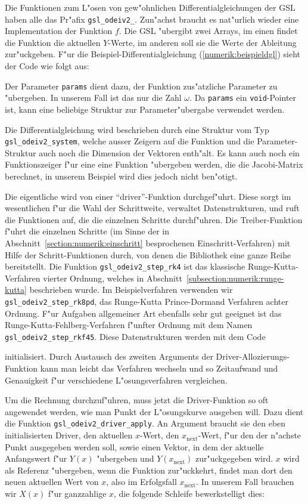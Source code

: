 Die Funktionen zum L"osen von gew"ohnlichen Differentialgleichungen
der GSL haben alle das Pr"afix \texttt{gsl\_odeiv2\_}. 
Zun"achst braucht es nat"urlich wieder eine Implementation der
Funktion $f$. 
Die GSL "ubergibt zwei Arrays, im einen findet die Funktion die aktuellen
$Y$-Werte, im anderen soll sie die Werte der Ableitung zur"uckgeben.
F"ur die Beispiel-Differentialgleichung (\ref{numerik:beispieldgl})
sieht der Code wie folgt aus:

Der Parameter \texttt{params} dient dazu, der Funktion zus"atzliche
Parameter zu "ubergeben.
In unserem Fall ist das nur die Zahl $\omega$.
Da \texttt{params} ein \texttt{void}-Pointer ist, kann eine beliebige
Struktur zur Parameter"ubergabe verwendet werden.

Die Differentialgleichung wird beschrieben durch eine Struktur vom Typ
\texttt{gsl\_odeiv2\_system}, welche ausser Zeigern auf die Funktion
und die Parameter-Struktur auch noch die Dimension der Vektoren enth"alt.
Es kann auch noch ein Funktionszeiger f"ur eine eine Funktion "ubergeben
werden, die die Jacobi-Matrix berechnet, in unserem Beispiel wird dies
jedoch nicht ben"otigt.

Die eigentliche wird von einer ``driver''-Funktion durchgef"uhrt.
Diese sorgt im wesentlichen f"ur die Wahl der Schrittweite, verwaltet
Datenstrukturen, und ruft die Funktionen auf, die die einzelnen Schritte
durchf"uhren.
Die Treiber-Funktion f"uhrt die einzelnen Schritte (im Sinne der
in Abschnitt~\ref{section:numerik:einschritt} besprochenen
Einschritt-Verfahren) mit
Hilfe der Schritt-Funktionen durch, von denen die Bibliothek eine
ganze Reihe bereitstellt.
Die Funktion \texttt{gsl\_odeiv2\_step\_rk4} ist das klassische
Runge-Kutta-Verfahren vierter Ordnung, welches in
Abschnitt~\ref{subsection:numerik:runge-kutta}
beschrieben wurde.
Im Beispielverfahren verwenden wir \texttt{gsl\_odeiv2\_step\_rk8pd},
das Runge-Kutta Prince-Dormand Verfahren achter Ordnung.
F"ur Aufgaben allgemeiner Art ebenfalls sehr gut geeignet ist das
Runge-Kutta-Fehlberg-Verfahren f"unfter Ordnung mit dem Namen
\texttt{gsl\_odeiv2\_step\_rkf45}.
Diese Datenstrukturen werden mit dem Code

initialisiert.
Durch Austausch des zweiten Arguments der Driver-Allozierungs-Funktion
kann man leicht das Verfahren wechseln und so Zeitaufwand und Genauigkeit
f"ur verschiedene L"osungsverfahren vergleichen.

Um die Rechnung durchzuf"uhren, muss jetzt die Driver-Funktion so oft
angewendet werden, wie man Punkt der L"osungskurve ausgeben will.
Dazu dient die Funktion \texttt{gsl\_odeiv2\_driver\_apply}. 
An Argument braucht sie den eben initialisierten Driver, den aktuellen
$x$-Wert, den $x_{\text{next}}$-Wert, f"ur den der n"achste Punkt
ausgegeben werden soll, sowie einen Vektor, in dem der aktuelle Anfangswert
f"ur $Y(x)$ "ubergeben und $Y(x_{\text{next}})$ zur"uckgegeben wird.
$x$ wird als Referenz "ubergeben, wenn die Funktion zur"uckkehrt,
findet man dort den neuen aktuellen Wert von $x$, also im Erfolgsfall
$x_{\text{next}}$.
In unserem Fall brauchen wir $X(x)$ f"ur ganzzahlige $x$, die folgende
Schleife bewerkstelligt dies:


